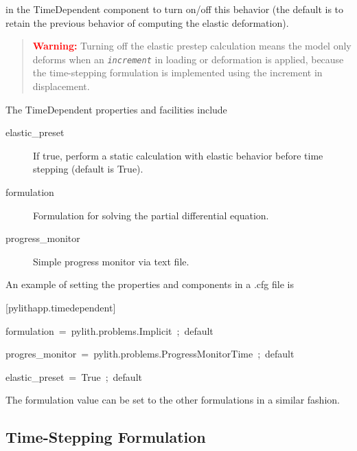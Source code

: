 in the TimeDependent component to turn on/off this behavior (the default
is to retain the previous behavior of computing the elastic deformation). 
\begin{quote}
\textbf{\textcolor{red}{Warning:}}\textbf{ }Turning off the elastic
prestep calculation means the model only deforms when an \texttt{\textit{increment}}
in loading or deformation is applied, because the time-stepping formulation
is implemented using the increment in displacement.
\end{quote}
The TimeDependent properties and facilities include
\begin{description}
\item [{elastic\_preset}] If true, perform a static calculation with elastic
behavior before time stepping (default is True).
\item [{formulation}] Formulation for solving the partial differential
equation.
\item [{progress\_monitor}] Simple progress monitor via text file.
\end{description}
An example of setting the properties and components in a .cfg file
is
\begin{lyxcode}
{[}pylithapp.timedependent{]}

formulation~=~pylith.problems.Implicit~;~default

progres\_monitor~=~pylith.problems.ProgressMonitorTime~;~default

elastic\_preset~=~True~;~default
\end{lyxcode}
The formulation value can be set to the other formulations in a similar
fashion. 


\subsection{Time-Stepping Formulation}


